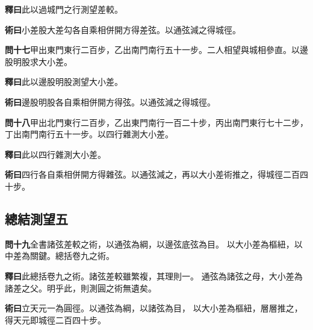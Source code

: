 \documentclass[12pt,a4paper]{article}
\newcommand{\Section}[1]{\subsection*{#1}}
\begin{document}
\noindent\textbf{釋曰}\quad 此以過城門之行測望差較。

\vspace{0.3em}

\noindent\textbf{術曰}\quad 小差股大差勾各自乘相併開方得差弦。以通弦減之得城徑。

\vspace{0.5em}

\noindent\textbf{問十七}\quad 甲出東門東行二百步，乙出南門南行五十一步。二人相望與城相參直。以邊股明股求大小差。

\vspace{0.3em}

\noindent\textbf{釋曰}\quad 此以邊股明股測望大小差。

\vspace{0.3em}

\noindent\textbf{術曰}\quad 邊股明股各自乘相併開方得弦。以通弦減之得城徑。

\vspace{0.5em}

\noindent\textbf{問十八}\quad 甲出北門東行二百步，乙出東門南行一百二十步，丙出南門東行七十二步，丁出南門南行五十一步。以四行雜測大小差。

\vspace{0.3em}

\noindent\textbf{釋曰}\quad 此以四行雜測大小差。

\vspace{0.3em}

\noindent\textbf{術曰}\quad 四行各自乘相併開方得雜弦。以通弦減之，再以大小差術推之，得城徑二百四十步。

\Section{總結測望五}

\noindent\textbf{問十九}\quad 全書諸弦差較之術，以通弦為綱，以邊弦底弦為目。
以大小差為樞紐，以中差為關鍵。總括卷九之術。

\vspace{0.3em}

\noindent\textbf{釋曰}\quad 此總括卷九之術。諸弦差較雖繁複，其理則一。
通弦為諸弦之母，大小差為諸差之父。明乎此，則測圓之術無遺矣。

\vspace{0.3em}

\noindent\textbf{術曰}\quad 立天元一為圓徑。以通弦為綱，以諸弦為目，
以大小差為樞紐，層層推之，得天元即城徑二百四十步。

\vspace{0.3em}
\end{document}
